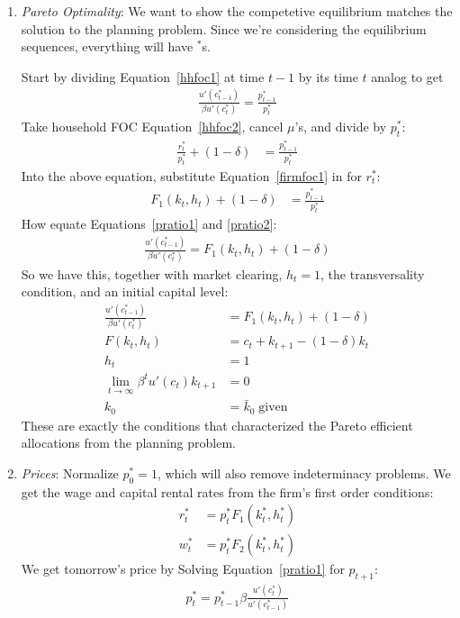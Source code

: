 \documentclass[12pt]{article}
\theoremstyle{plain}
\theoremstyle{definition}
\theoremstyle{remark}
\newcommand{\limt}{\lim_{t\rightarrow\infty}}
\begin{document}
\begin{enumerate}
  \item \emph{Pareto Optimality}: We want to show the competetive
    equilibrium matches the solution to the planning problem. Since
    we're considering the equilibrium sequences, everything will have
    ${}^*$s.

    Start by dividing Equation~\ref{hhfoc1} at time $t-1$ by its time
    $t$ analog to get
    \begin{align}
      \frac{u'(c_{t-1}^*)}{\beta u'(c_{t}^*)} = \frac{p_{t-1}^*}{p_t^*}
      \label{pratio1}
    \end{align}
    Take household FOC Equation~\ref{hhfoc2}, cancel $\mu$'s, and divide
    by $p_t^*$:
    \begin{align*}
      \frac{r_t^*}{p_t^*} + (1-\delta)
      &= \frac{p_{t-1}^*}{p_t^*}
    \end{align*}
    Into the above equation, substitute Equation~\ref{firmfoc1} in for
    $r_t^*$:
    \begin{align}
      F_1(k_t,h_t) + (1-\delta)
      &= \frac{p_{t-1}^*}{p_t^*}
      \label{pratio2}
    \end{align}
    How equate Equations~\ref{pratio1} and \ref{pratio2}:
    \begin{align*}
      \frac{u'(c_{t-1}^*)}{\beta u'(c_{t}^*)}
      = F_1(k_t,h_t) + (1-\delta)
    \end{align*}
    So we have this, together with market clearing, $h_t=1$, the
    transversality condition, and an initial capital level:
    \begin{align*}
      \frac{u'(c_{t-1}^*)}{\beta u'(c_{t}^*)}
      &= F_1(k_t,h_t) + (1-\delta) \\
      F(k_t,h_t) &= c_t + k_{t+1} - (1-\delta) k_t \\
      h_t &= 1\\
      \limt \beta^t u'(c_t) k_{t+1}&=0\\
      k_0 &= \bar{k}_0 \; \text{given}
    \end{align*}
    These are exactly the conditions that characterized the Pareto
    efficient allocations from the planning problem.

  \item \emph{Prices}: Normalize $p_0^*=1$, which will also remove
    indeterminacy problems. We get the wage and capital rental rates
    from the firm's first order conditions:
    \begin{align*}
      r_t^* &= p_t^* F_1(k^*_t,h^*_t) \\
      w_t^* &= p_t^* F_2(k^*_t,h^*_t)
    \end{align*}
    We get tomorrow's price by Solving Equation~\ref{pratio1} for
    $p_{t+1}$:
    \begin{align}
       p_t^*
       = p_{t-1}^*\beta \frac{u'(c_{t}^*)}{u'(c_{t-1}^*)}
    \end{align}
\end{enumerate}
\end{document}
